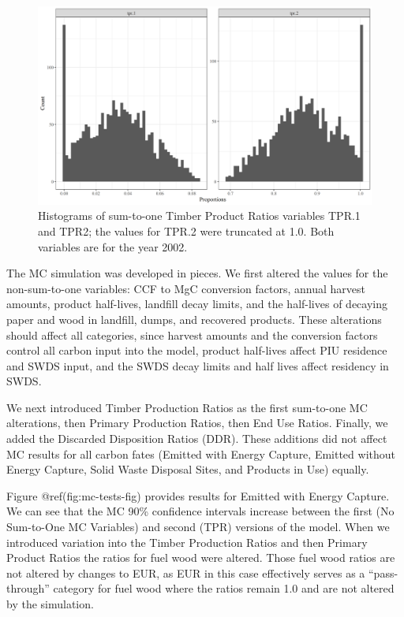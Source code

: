 \documentclass[
  openany]{book}
\begin{document}
\begin{figure}
\includegraphics[width=1\linewidth]{images/triang3} \caption{Histograms of sum-to-one Timber Product Ratios variables TPR.1 and TPR2; the values for TPR.2 were truncated at 1.0.  Both variables are for the year 2002.}\label{fig:mc-tri3-fig}
\end{figure}

The MC simulation was developed in pieces. We first altered the values
for the non-sum-to-one variables: CCF to MgC conversion factors, annual
harvest amounts, product half-lives, landfill decay limits, and the
half-lives of decaying paper and wood in landfill, dumps, and recovered
products. These alterations should affect all categories, since harvest
amounts and the conversion factors control all carbon input into the
model, product half-lives affect PIU residence and SWDS input, and the
SWDS decay limits and half lives affect residency in SWDS.

We next introduced Timber Production Ratios as the first sum-to-one MC
alterations, then Primary Production Ratios, then End Use Ratios.
Finally, we added the Discarded Disposition Ratios (DDR). These
additions did not affect MC results for all carbon fates (Emitted with
Energy Capture, Emitted without Energy Capture, Solid Waste Disposal
Sites, and Products in Use) equally.

Figure @ref(fig:mc-tests-fig) provides results for Emitted with Energy
Capture. We can see that the MC 90\% confidence intervals increase
between the first (No Sum-to-One MC Variables) and second (TPR) versions
of the model. When we introduced variation into the Timber Production
Ratios and then Primary Product Ratios the ratios for fuel wood were
altered. Those fuel wood ratios are not altered by changes to EUR, as
EUR in this case effectively serves as a ``pass-through'' category for
fuel wood where the ratios remain 1.0 and are not altered by the
simulation.
\end{document}
